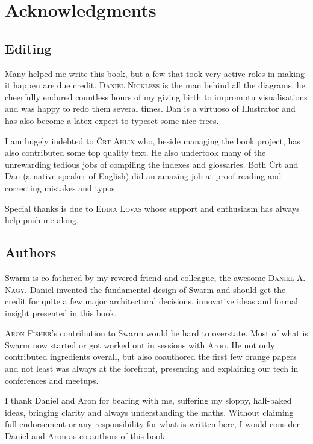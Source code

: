 \newcommand{\person}[1]{{\scshape #1}}
\chapter{Acknowledgments \statusgreen}

\section*{Editing}

Many helped me write this book, but a few that took very active roles in making it happen are due credit. \person{Daniel Nickless} is the man behind all the diagrams, he cheerfully endured countless hours of my giving birth to impromptu visualisations and was happy to redo them several times. Dan is a virtuoso of Illustrator and has also become a latex expert to typeset some nice trees. 

I am hugely indebted to \person{Črt Ahlin} who, beside managing the book project, has also contributed some top quality text.
He also undertook many of the unrewarding tedious jobs of compiling the indexes and glossaries. Both Črt and Dan (a native speaker of English) did an amazing job at proof-reading and correcting mistakes and typos.

Special thanks is due to \person{Edina Lovas} whose support and enthusiasm has always help push me along. 

\section*{Authors}

Swarm is co-fathered by my revered friend and colleague, the awesome \person{Daniel A. Nagy}.  Daniel invented the fundamental design of Swarm and should get the credit for quite a few major architectural decisions, innovative ideas and formal insight presented in this book. 

\person{Aron Fisher}'s contribution to Swarm would be hard to overstate. Most of what is Swarm now started or got worked out in sessions with Aron.  He not only contributed ingredients overall, but also coauthored the first few orange papers and not  least was always at the forefront, presenting and explaining our tech in conferences and meetups.

I thank Daniel and Aron for bearing with me, suffering my sloppy, half-baked ideas, bringing clarity and always understanding the maths.
Without claiming full endorsement or any responsibility for what is written here,
I would consider Daniel and Aron as co-authors of this book.

